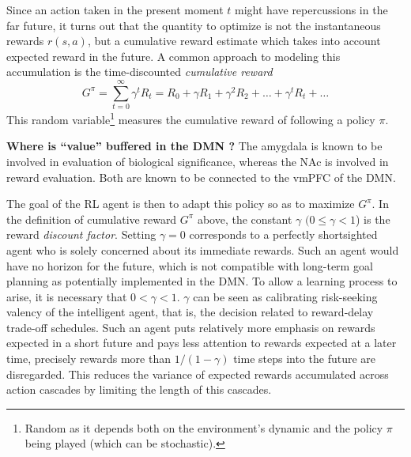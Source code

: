 \documentclass[10pt,letterpaper]{article}
\begin{document}
Since an action taken in the present moment $t$
might have repercussions in the far future, it turns out that the
quantity to optimize is not the instantaneous rewards $r(s, a)$, but a
cumulative reward estimate which takes into account expected reward in the future.
A common approach to
modeling this accumulation is the time-discounted \textit{cumulative reward}%
\begin{equation}
  \label{eq:cumr}
  G^\pi = \sum_{t=0}^{\infty}\gamma^{t}R_t = R_0 + \gamma R_1 + \gamma^2 R_2 + \ldots + \gamma^tR_t + \ldots
\end{equation}
This random variable\footnote{Random as it depends both on the environment's dynamic and the
  policy $\pi$ being played (which can be stochastic).}  measures the cumulative reward of
following a policy $\pi$.
\begin{mdframed}
  \textbf{Where is ``value'' buffered in the DMN ?
    }
  The amygdala is known to be involved in evaluation of biological significance,
  whereas
  the NAc is involved in reward evaluation. Both are known to
  be connected to the vmPFC of the DMN.
\end{mdframed}
  The goal of the RL agent is then to adapt this policy so as to  maximize $G^\pi$. In
  the definition of cumulative reward $G^\pi$ above, the constant $\gamma$ $(0 \le \gamma < 1$) is the reward \textit{discount factor}.
Setting $\gamma = 0$ corresponds to a perfectly shortsighted agent who is solely concerned about its immediate rewards.
Such an agent would have no horizon for the future,
which is not compatible with long-term goal planning
as potentially implemented in the DMN.
To allow a learning process to arise,
it is necessary that $0 < \gamma < 1$.
$\gamma$ can be seen as calibrating risk-seeking valency of the intelligent agent,
that is, the decision related to reward-delay trade-off schedules.
Such an agent puts relatively more emphasis on rewards expected in
a short future and pays less attention to
rewards expected at a later time, precisely rewards more than $1/(1 - \gamma)$ time steps into the future are disregarded.
This reduces the variance of expected rewards accumulated across action cascades by limiting the length of this cascades.
\end{document}
